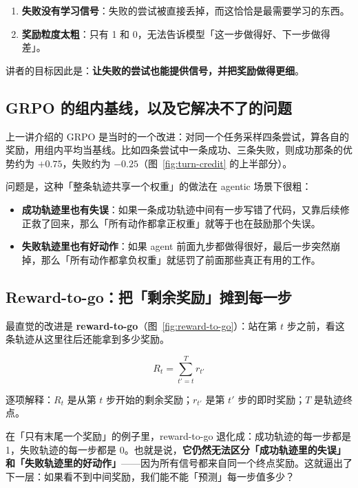 \documentclass[a4paper]{article}
\begin{document}
\begin{enumerate}
\item \textbf{失败没有学习信号}：失败的尝试被直接丢掉，而这恰恰是最需要学习的东西。
\item \textbf{奖励粒度太粗}：只有 1 和 0，无法告诉模型「这一步做得好、下一步做得差」。
\end{enumerate}

讲者的目标因此是：\textbf{让失败的尝试也能提供信号，并把奖励做得更细}。

\subsection{GRPO 的组内基线，以及它解决不了的问题}

上一讲介绍的 GRPO 是当时的一个改进：对同一个任务采样四条尝试，算各自的奖励，用组内平均当基线。比如四条尝试中一条成功、三条失败，则成功那条的优势约为 $+0.75$，失败约为 $-0.25$（图~\ref{fig:turn-credit} 的上半部分）。

问题是，这种「整条轨迹共享一个权重」的做法在 agentic 场景下很粗：

\begin{itemize}
\item \textbf{成功轨迹里也有失误}：如果一条成功轨迹中间有一步写错了代码，又靠后续修正救了回来，那么「所有动作都拿正权重」就等于也在鼓励那个失误。
\item \textbf{失败轨迹里也有好动作}：如果 agent 前面九步都做得很好，最后一步突然崩掉，那么「所有动作都拿负权重」就惩罚了前面那些真正有用的工作。
\end{itemize}

\subsection{Reward-to-go：把「剩余奖励」摊到每一步}

最直觉的改进是 \textbf{reward-to-go}（图~\ref{fig:reward-to-go}）：站在第 $t$ 步之前，看这条轨迹从这里往后还能拿到多少奖励。

$$R_t = \sum_{t'=t}^{T} r_{t'}$$

逐项解释：$R_t$ 是从第 $t$ 步开始的剩余奖励；$r_{t'}$ 是第 $t'$ 步的即时奖励；$T$ 是轨迹终点。

在「只有末尾一个奖励」的例子里，reward-to-go 退化成：成功轨迹的每一步都是 1，失败轨迹的每一步都是 0。也就是说，\textbf{它仍然无法区分「成功轨迹里的失误」和「失败轨迹里的好动作」}——因为所有信号都来自同一个终点奖励。这就逼出了下一层：如果看不到中间奖励，我们能不能「预测」每一步值多少？
\end{document}
